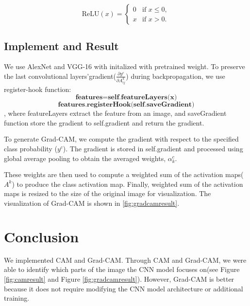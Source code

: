 \documentclass[extendedabs]{bmvc2k}
\begin{document}
$$
\text{ReLU}(x) =
\begin{cases} 
0 & \text{if } x \leq 0, \\
x & \text{if } x > 0.
\end{cases}
$$

\subsection{Implement and Result}
We use AlexNet\cite{alexnet} and VGG-16\cite{vggnet} with initalized with pretrained weight. To preserve the last convolutional layers'gradient($\frac{\partial y^c}{\partial A^k_{ij}}$) during backpropagation, we use register-hook function:
$$
\textbf{features} = \textbf{self.featureLayers(x)}
$$
$$
\textbf{features.registerHook(self.saveGradient)}
$$
, where featureLayers extract the feature from an image, and saveGradient function store the gradient to self.gradient and return the gradient.

To generate Grad-CAM, we compute the gradient with respect to the specified class probability ($y^c$). The gradient is stored in self.gradient and processed using global average pooling to obtain the averaged weights, $\alpha_k^c$. 

These weights are then used to compute a weighted sum of the activation maps($A^k$) to produce the class activation map. Finally, weighted sum of the activation maps is resized to the size of the original image for visualization. The visualization of Grad-CAM is shown in \ref{fig:gradcamresult}.
\section{Conclusion}
We implemented CAM\cite{cam} and Grad-CAM\cite{gradcam}. Through CAM and Grad-CAM, we were able to identify which parts of the image the CNN model focuses on(see Figure \ref{fig:camresult} and Figure \ref{fig:gradcamresult}). However, Grad-CAM is better because it does not require modifying the CNN model architecture or additional training.
\end{document}

